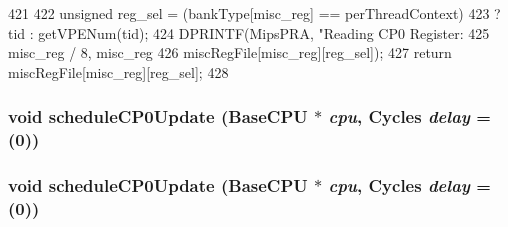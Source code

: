 \begin{DoxyCode}
421 {
422     unsigned reg_sel = (bankType[misc_reg] == perThreadContext)
423         ? tid : getVPENum(tid);
424     DPRINTF(MipsPRA, "Reading CP0 Register:%
425             misc_reg / 8, misc_reg %
426             miscRegFile[misc_reg][reg_sel]);
427     return miscRegFile[misc_reg][reg_sel];
428 }
\end{DoxyCode}
\hypertarget{classMipsISA_1_1ISA_a85221cc4f7fe8618574a72b6410318f4}{
\subsubsection[{scheduleCP0Update}]{\setlength{\rightskip}{0pt plus 5cm}void scheduleCP0Update ({\bf BaseCPU} $\ast$ {\em cpu}, \/  {\bf Cycles} {\em delay} = {(0)})}}
\label{classMipsISA_1_1ISA_a85221cc4f7fe8618574a72b6410318f4}
\hypertarget{classMipsISA_1_1ISA_a85221cc4f7fe8618574a72b6410318f4}{
\subsubsection[{scheduleCP0Update}]{\setlength{\rightskip}{0pt plus 5cm}void scheduleCP0Update ({\bf BaseCPU} $\ast$ {\em cpu}, \/  {\bf Cycles} {\em delay} = {(0)})}}
\label{classMipsISA_1_1ISA_a85221cc4f7fe8618574a72b6410318f4}



